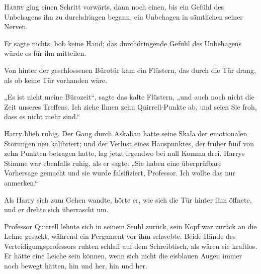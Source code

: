 
\lettrine{H}{arry} ging einen Schritt vorwärts, dann noch einen, bis ein Gefühl des Unbehagens ihn zu durchdringen begann, ein Unbehagen in sämtlichen seiner Nerven.

Er sagte nichts, hob keine Hand; das durchdringende Gefühl des Unbehagens würde es für ihn mitteilen.

Von hinter der geschlossenen Bürotür kam ein Flüstern, das durch die Tür drang, als ob keine Tür vorhanden wäre.

„Es ist nicht meine Bürozeit“, sagte das kalte Flüstern, „und auch noch nicht die Zeit unseres Treffens. Ich ziehe Ihnen zehn Quirrell-Punkte ab, und seien Sie froh, dass es nicht mehr sind.“

Harry blieb ruhig. Der Gang durch Askaban hatte seine Skala der emotionalen Störungen neu kalibriert; und der Verlust eines Hauspunktes, der früher fünf von zehn Punkten betragen hatte, lag jetzt irgendwo bei null Komma drei. Harrys Stimme war ebenfalls ruhig, als er sagte: „Sie haben eine überprüfbare Vorhersage gemacht und sie wurde falsifiziert, Professor. Ich wollte das nur anmerken.“

Als Harry sich zum Gehen wandte, hörte er, wie sich die Tür hinter ihm öffnete, und er drehte sich überrascht um.

Professor Quirrell lehnte sich in seinem Stuhl zurück, sein Kopf war zurück an die Lehne gesackt, während ein Pergament vor ihm schwebte. Beide Hände des Verteidigungsprofessors ruhten schlaff auf dem Schreibtisch, als wären sie kraftlos. Er hätte eine Leiche sein können, wenn sich nicht die eisblauen Augen immer noch bewegt hätten, hin und her, hin und her.


